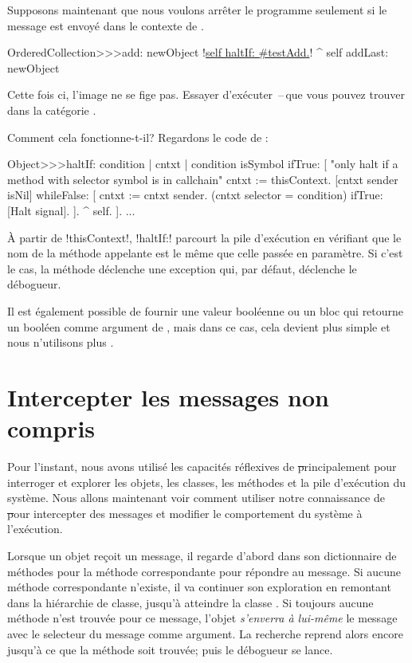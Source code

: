 \documentclass[a4paper,10pt,twoside]{book}
\begin{document}
Supposons maintenant que nous voulons arrêter le programme seulement si le message  est envoyé dans le contexte de .

\begin{code}{}
OrderedCollection>>>add: newObject
	!\underline{self haltIf: \#testAdd.}!
	^ self addLast: newObject
\end{code}

Cette fois ci, l'image ne se fige pas. Essayer d'exécuter \,--\,que vous pouvez trouver dans la catégorie \mbox{.}

Comment cela fonctionne-t-il? Regardons le code de \mbox{:}
\begin{code}{}
Object>>>haltIf: condition
	| cntxt |
	condition isSymbol ifTrue: [
		"only halt if a method with selector symbol is in callchain"
		cntxt := thisContext.
		[cntxt sender isNil] whileFalse: [
			cntxt := cntxt sender. 
			(cntxt selector = condition) ifTrue: [Halt signal]. ].
		^ self.
	].
	...
\end{code}

À partir de \ct!thisContext!, \ct!haltIf:! parcourt la pile d'exécution en vérifiant que le nom de la méthode appelante est le même que celle passée en paramètre. Si c'est le cas, la méthode déclenche une exception qui, par défaut, déclenche le débogueur.

Il est également possible de fournir une valeur booléenne ou un bloc qui retourne un booléen comme argument de , mais dans ce cas, cela devient plus simple et nous n'utilisons plus .

\section{Intercepter les messages non compris}

Pour l'instant, nous avons utilisé les capacités réflexives de \st principalement pour interroger et explorer les objets, les classes, les méthodes et la pile d'exécution du système. Nous allons maintenant voir comment utiliser notre connaissance de \st pour intercepter des messages et modifier le comportement du système à l'exécution.

Lorsque un objet reçoit un message, il regarde d'abord dans son dictionnaire de méthodes pour la méthode correspondante pour répondre au message.
Si aucune méthode correspondante n'existe, il va continuer son exploration en remontant dans la hiérarchie de classe, jusqu'à atteindre la classe .
Si toujours aucune méthode n'est trouvée pour ce message, l'objet \emph{s'enverra à lui-même} %
le message  avec le selecteur du message comme argument.
La recherche reprend alors encore jusqu'à ce que la méthode
 soit trouvée; puis le débogueur se lance.
\end{document}
